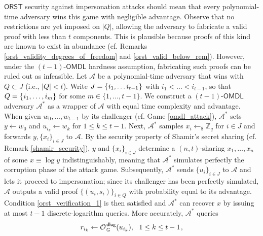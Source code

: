 \documentclass{iacrtrans}
\begin{document}
\noindent
$\mathsf{ORST}$ security against impersonation attacks
should mean that every polynomial-time adversary wins this game
with negligible advantage.
Observe that no restrictions are yet imposed on $|Q|$,
allowing the adversary to fabricate
a valid proof with less than $t$ components.
This is plausible because proofs of this kind
are known to exist in abundance
(cf. Remarks \ref{orst_validity_degrees_of_freedom}
and \ref{orst_valid_below_rem}).
However, under the $(t-1)$-$\mathsf{OMDL}$ hardness assumption,
fabricating such proofs can be ruled out as infeasible.
Let $\mathcal{A}$ be a polynomial-time adversary
that wins with $Q \subset J$ (i.e., $|Q| < t$).
Write $J = \{\hspace{0.5pt}i_1, \dots i_{t-1}\hspace{0.5pt}\}$
with $i_1 < \dots < i_{t-1}$, so that
$Q = \{\hspace{0.5pt}i_1, \dots, i_m\}$
for some $m \in \{1, \dots, t-1\}$.
We construct a $(t-1)$-$\mathsf{OMDL}$ adversary
$\mathcal{A}^*$ as a wrapper of $\mathcal{A}$
with equal time complexity and advantage.
When given $w_0, \dots, w_{t-1}$ by its challenger
(cf. Game \ref{omdl_attack}),
$\mathcal{A}^*$ sets $y \leftarrow w_0$ and
$u_{i_k} \leftarrow w_k$ for $1 \le k \le t-1$.
Next, $\mathcal{A}^*$ samples
$x_i \leftarrow_\$ \mathbb{Z}_q$ for $i \in J$
and forwards $y, \{x_i\}_{i \in J}$ to $\mathcal{A}$.
By the security property of Shamir's secret sharing
(cf. Remark \ref{shamir_security}),
$y$ and $\{x_i\}_{i \in J}$
determine a $(n, t)$-sharing $x_1, \dots, x_n$
of some $x \equiv \log y$
indistinguishably, meaning that $\mathcal{A}^*$
simulates perfectly the corruption phase of the attack game.
Subsequently, $\mathcal{A}^*$ sends $\{u_i\}_{i \in J}$ to $\mathcal{A}$
and lets it proceed to impersonation;
since its challenger has been perfectly simulated,
$\mathcal{A}$ outputs a valid proof $\{(u_i, s_i)\}_{i \in Q}$
with probability equal to its advantage.
Condition \eqref{orst_verification_1}
is then satisfied and $\mathcal{A}^*$ can recover $x$ by issuing
at most $t-1$ discrete-logarithm queries.
More accurately, $\mathcal{A}^*$ queries
\vspace{5pt}
\begin{equation*}
r_{i_k} \leftarrow \mathcal{O}
	_{\hspace{1pt}\mathbb{G}}
	^{\hspace{1pt}\mathsf{dlog}}(u_{i_k}),
\ \ 1 \le k \le t-1
\hspace{1pt},
\vspace{5pt}
\end{equation*}
\end{document}
